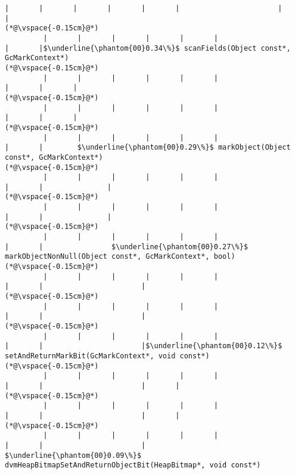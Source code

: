 \begin{lstlisting}[caption=NewDirectByteBuffer, label=profile:C2JNewDirectBuffer-512, numberbychapter=true, frame=lines, float, floatplacement=t]
         |       |       |       |       |       |                       |       |
(*@\vspace{-0.15cm}@*)
         |       |       |       |       |       |                       |       |$\underline{\phantom{00}0.34\%}$ scanFields(Object const*, GcMarkContext*)
(*@\vspace{-0.15cm}@*)
         |       |       |       |       |       |                       |       |       |
(*@\vspace{-0.15cm}@*)
         |       |       |       |       |       |                       |       |       |
(*@\vspace{-0.15cm}@*)
         |       |       |       |       |       |                       |       |        $\underline{\phantom{00}0.29\%}$ markObject(Object const*, GcMarkContext*)
(*@\vspace{-0.15cm}@*)
         |       |       |       |       |       |                       |       |               |
(*@\vspace{-0.15cm}@*)
         |       |       |       |       |       |                       |       |               |
(*@\vspace{-0.15cm}@*)
         |       |       |       |       |       |                       |       |                $\underline{\phantom{00}0.27\%}$ markObjectNonNull(Object const*, GcMarkContext*, bool)
(*@\vspace{-0.15cm}@*)
         |       |       |       |       |       |                       |       |                       |
(*@\vspace{-0.15cm}@*)
         |       |       |       |       |       |                       |       |                       |
(*@\vspace{-0.15cm}@*)
         |       |       |       |       |       |                       |       |                       |$\underline{\phantom{00}0.12\%}$ setAndReturnMarkBit(GcMarkContext*, void const*)
(*@\vspace{-0.15cm}@*)
         |       |       |       |       |       |                       |       |                       |       |
(*@\vspace{-0.15cm}@*)
         |       |       |       |       |       |                       |       |                       |       |
(*@\vspace{-0.15cm}@*)
         |       |       |       |       |       |                       |       |                       |        $\underline{\phantom{00}0.09\%}$ dvmHeapBitmapSetAndReturnObjectBit(HeapBitmap*, void const*)

\end{lstlisting}
